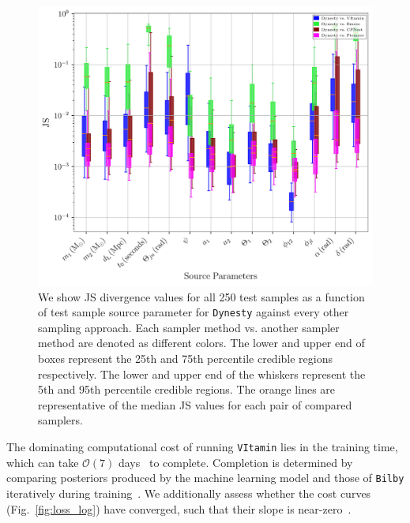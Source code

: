 \begin{figure}
    \includegraphics[width=\columnwidth]{figures/JS_IndiPar_dynesty.png}
    \caption[JS divergences of individual source parameters for \texttt{Dynesty} against all other approaches.]{\label{fig:JS_indi_par_dynesty} We show JS divergence values for all 250 test samples as a function of test sample source parameter for \texttt{Dynesty} against every other sampling approach. Each sampler method vs. another sampler method are denoted as different colors. The lower and upper end of boxes represent the 25th and 75th percentile credible regions respectively. The lower and upper end of the whiskers represent the 5th and 95th percentile credible regions. The orange lines are representative of the median JS values for each pair of compared samplers.}
\end{figure}

%
%
The dominating computational cost of running \texttt{VItamin} lies 
in the training time, which can take $\mathcal{O}(7)$ days~ 
to complete. Completion is determined by comparing posteriors 
produced by the machine learning model and those of 
\texttt{Bilby} iteratively during training~. We 
additionally assess whether the cost curves (Fig.~\ref{fig:loss_log}) 
have converged, such that 
their slope is near-zero~.


